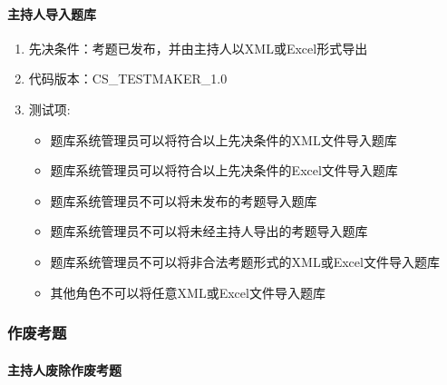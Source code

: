 \documentclass[hyperref, a4paper]{ctexart}
\providecommand{\tightlist}{%
  \setlength{\itemsep}{0pt}\setlength{\parskip}{0pt}}
\let\oldparagraph\paragraph
\renewcommand{\paragraph}[1]{\oldparagraph{#1}\mbox{}}
\begin{document}
\hypertarget{ux4e3bux6301ux4ebaux5bfcux5165ux9898ux5e93}{%
\paragraph{主持人导入题库}\label{ux4e3bux6301ux4ebaux5bfcux5165ux9898ux5e93}}

\begin{enumerate}
\def\labelenumi{\arabic{enumi}.}
\tightlist
\item
  先决条件：考题已发布，并由主持人以XML或Excel形式导出
\item
  代码版本：CS\_TESTMAKER\_1.0
\item
  测试项:

  \begin{itemize}
  \tightlist
  \item
    题库系统管理员可以将符合以上先决条件的XML文件导入题库
  \item
    题库系统管理员可以将符合以上先决条件的Excel文件导入题库
  \item
    题库系统管理员不可以将未发布的考题导入题库
  \item
    题库系统管理员不可以将未经主持人导出的考题导入题库
  \item
    题库系统管理员不可以将非合法考题形式的XML或Excel文件导入题库
  \item
    其他角色不可以将任意XML或Excel文件导入题库
  \end{itemize}
\end{enumerate}

\hypertarget{ux4f5cux5e9fux8003ux9898}{%
\subsubsection{作废考题}\label{ux4f5cux5e9fux8003ux9898}}

\hypertarget{ux4e3bux6301ux4ebaux5e9fux9664ux4f5cux5e9fux8003ux9898}{%
\paragraph{主持人废除作废考题}\label{ux4e3bux6301ux4ebaux5e9fux9664ux4f5cux5e9fux8003ux9898}}
\end{document}
